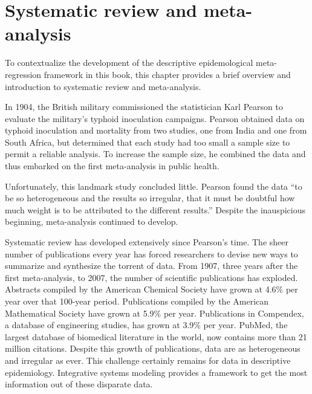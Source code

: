 \section{Systematic review and meta-analysis}
To contextualize the development of the descriptive epidemological
meta-regression framework in this book, this chapter provides a brief
overview and introduction to systematic review and meta-analysis.

In 1904, the British military commissioned the statistician Karl
Pearson to evaluate the military's typhoid inoculation
campaigns.\cite{Pearson_Report_1904} Pearson obtained data on typhoid
inoculation and mortality from two studies, one from India and one
from South Africa, but determined that each study had too small a
sample size to permit a reliable analysis. To increase the sample
size, he combined the data and thus embarked on the first
meta-analysis in public health.

Unfortunately, this landmark study concluded little. Pearson found the
data ``to be so heterogeneous and the results so irregular, that it
must be doubtful how much weight is to be attributed to the different
results.'' Despite the inauspicious beginning, meta-analysis continued
to develop.


Systematic review has developed extensively since Pearson's time. The
sheer number of publications every year has forced researchers to
devise new ways to summarize and synthesize the torrent of data. From
1907, three years after the first meta-analysis, to 2007, the number of
scientific publications has exploded. Abstracts compiled by the
American Chemical Society have grown at 4.6\% per year over that
100-year period. Publications compiled by the American Mathematical
Society have grown at 5.9\% per year.  Publications in Compendex, a
database of engineering studies, has grown at 3.9\% per year.
\cite{Larsen_Rate_2010} PubMed, the largest database of biomedical
literature in the world, now contains more than 21 million citations.
\cite{US_PubMed_2012} Despite this growth of publications, data are 
as heterogeneous and irregular as ever. This challenge certainly remains 
for data in descriptive epidemiology. Integrative systems modeling 
provides a framework to get the most information out of these disparate data.

